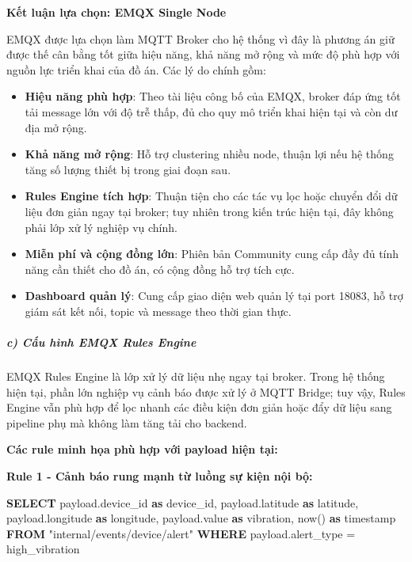 \documentclass[a4paper]{extarticle}
\newenvironment{Shaded}{}{}
\newcommand{\DataTypeTok}[1]{\textcolor[rgb]{0.56,0.13,0.00}{#1}}
\newcommand{\FunctionTok}[1]{\textcolor[rgb]{0.02,0.16,0.49}{#1}}
\newcommand{\KeywordTok}[1]{\textcolor[rgb]{0.00,0.44,0.13}{\textbf{#1}}}
\newcommand{\NormalTok}[1]{#1}
\newcommand{\OperatorTok}[1]{\textcolor[rgb]{0.40,0.40,0.40}{#1}}
\newcommand{\OtherTok}[1]{\textcolor[rgb]{0.00,0.44,0.13}{#1}}
\newcommand{\StringTok}[1]{\textcolor[rgb]{0.25,0.44,0.63}{#1}}
\providecommand{\tightlist}{%
  \setlength{\itemsep}{0pt}\setlength{\parskip}{0pt}}
\begin{document}
\textbf{Kết luận lựa chọn: EMQX Single Node}

EMQX được lựa chọn làm MQTT Broker cho hệ thống vì đây là phương án giữ
được thế cân bằng tốt giữa hiệu năng, khả năng mở rộng và mức độ phù hợp
với nguồn lực triển khai của đồ án. Các lý do chính gồm:

\begin{itemize}
\tightlist
\item
  \textbf{Hiệu năng phù hợp}: Theo tài liệu công bố của EMQX, broker đáp
  ứng tốt tải message lớn với độ trễ thấp, đủ cho quy mô triển khai hiện
  tại và còn dư địa mở rộng.
\item
  \textbf{Khả năng mở rộng}: Hỗ trợ clustering nhiều node, thuận lợi nếu
  hệ thống tăng số lượng thiết bị trong giai đoạn sau.
\item
  \textbf{Rules Engine tích hợp}: Thuận tiện cho các tác vụ lọc hoặc
  chuyển đổi dữ liệu đơn giản ngay tại broker; tuy nhiên trong kiến trúc
  hiện tại, đây không phải lớp xử lý nghiệp vụ chính.
\item
  \textbf{Miễn phí và cộng đồng lớn}: Phiên bản Community cung cấp đầy
  đủ tính năng cần thiết cho đồ án, có cộng đồng hỗ trợ tích cực.
\item
  \textbf{Dashboard quản lý}: Cung cấp giao diện web quản lý tại port
  18083, hỗ trợ giám sát kết nối, topic và message theo thời gian thực.
\end{itemize}

\subparagraph{c) Cấu hình EMQX Rules
Engine}\label{c-cux1ea5u-huxecnh-emqx-rules-engine}

EMQX Rules Engine là lớp xử lý dữ liệu nhẹ ngay tại broker. Trong hệ
thống hiện tại, phần lớn nghiệp vụ cảnh báo được xử lý ở MQTT Bridge;
tuy vậy, Rules Engine vẫn phù hợp để lọc nhanh các điều kiện đơn giản
hoặc đẩy dữ liệu sang pipeline phụ mà không làm tăng tải cho backend.

\textbf{Các rule minh họa phù hợp với payload hiện tại:}

\textbf{Rule 1 - Cảnh báo rung mạnh từ luồng sự kiện nội bộ:}

\begin{Shaded}
\begin{Highlighting}[]
\KeywordTok{SELECT}
\NormalTok{  payload.device\_id }\KeywordTok{as}\NormalTok{ device\_id,}
\NormalTok{  payload.latitude }\KeywordTok{as}\NormalTok{ latitude,}
\NormalTok{  payload.longitude }\KeywordTok{as}\NormalTok{ longitude,}
\NormalTok{  payload.}\FunctionTok{value} \KeywordTok{as}\NormalTok{ vibration,}
\NormalTok{  now() }\KeywordTok{as} \DataTypeTok{timestamp}
\KeywordTok{FROM} \OtherTok{"internal/events/device/alert"}
\KeywordTok{WHERE}\NormalTok{ payload.alert\_type }\OperatorTok{=} \StringTok{\textquotesingle{}high\_vibration\textquotesingle{}}
\end{Highlighting}
\end{Shaded}
\end{document}
